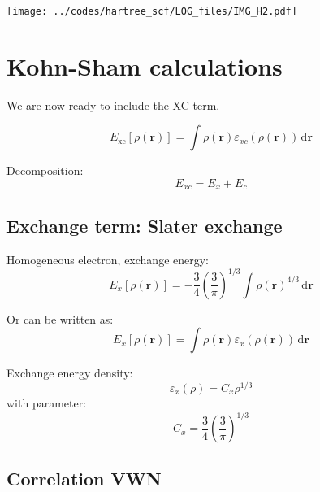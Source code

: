 \begin{figure*}[h]
\begin{center}
\texttt{[image: ../codes/hartree\_scf/LOG\_files/IMG\_H2.pdf]}
\end{center}
\end{figure*}




\section{Kohn-Sham calculations}

We are now ready to include the XC term.

\begin{equation}
E_{\mathrm{xc}}[\rho(\mathbf{r})] = \int \rho(\mathbf{r})
\varepsilon_{xc}(\rho(\mathbf{r}))\,\mathrm{d}\mathbf{r}
\end{equation}

Decomposition:
\begin{equation}
E_{xc} = E_{x} + E_{c}
\end{equation}

\subsection{Exchange term: Slater exchange}

Homogeneous electron, exchange energy:
\begin{equation}
E_{x}[\rho(\mathbf{r})] = -\frac{3}{4} \left(\frac{3}{\pi}\right)^{1/3}
\int \rho(\mathbf{r})^{4/3}\,\mathrm{d}\mathbf{r}
\end{equation}

Or can be written as:
\begin{equation}
E_{x}[\rho(\mathbf{r})] = \int \rho(\mathbf{r}) \varepsilon_{x}(\rho(\mathbf{r}))\,\mathrm{d}\mathbf{r}
\end{equation}

Exchange energy density:
\begin{equation}
\varepsilon_{x}(\rho) = C_{x}\rho^{1/3}
\end{equation}
with parameter:
\begin{equation}
C_{x} = \frac{3}{4}\left(\frac{3}{\pi}\right)^{1/3}  
\end{equation}


\subsection{Correlation VWN}

